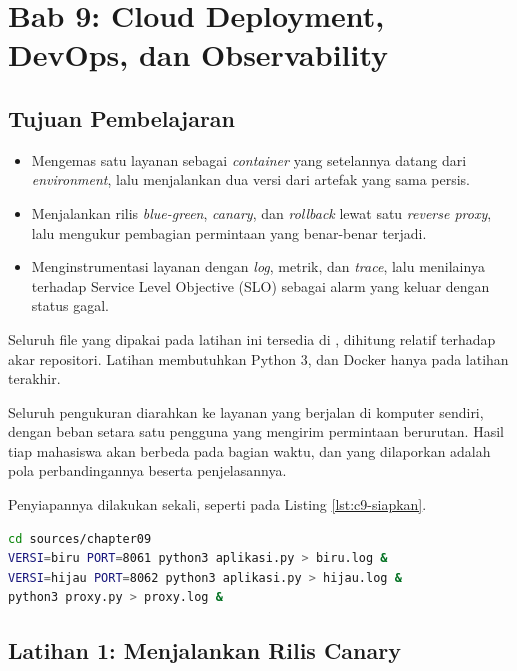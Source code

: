 \section{Bab 9: Cloud Deployment, DevOps, dan Observability}

\subsection*{Tujuan Pembelajaran}
\begin{itemize}
  \item Mengemas satu layanan sebagai \textit{container} yang setelannya
        datang dari \textit{environment}, lalu menjalankan dua versi dari
        artefak yang sama persis.
  \item Menjalankan rilis \textit{blue-green}, \textit{canary}, dan
        \textit{rollback} lewat satu \textit{reverse proxy}, lalu mengukur
        pembagian permintaan yang benar-benar terjadi.
  \item Menginstrumentasi layanan dengan \textit{log}, metrik, dan
        \textit{trace}, lalu menilainya terhadap Service Level Objective (SLO) sebagai alarm yang
        keluar dengan status gagal.
\end{itemize}

Seluruh file yang dipakai pada latihan ini tersedia di
, dihitung relatif terhadap akar repositori.
Latihan membutuhkan Python 3, dan Docker hanya pada latihan terakhir.

Seluruh pengukuran diarahkan ke layanan yang berjalan di komputer sendiri,
dengan beban setara satu pengguna yang mengirim permintaan berurutan. Hasil
tiap mahasiswa akan berbeda pada bagian waktu, dan yang dilaporkan adalah
pola perbandingannya beserta penjelasannya.

Penyiapannya dilakukan sekali, seperti pada Listing \ref{lst:c9-siapkan}.

\begin{lstlisting}[language=bash, caption={Menyalakan dua versi layanan beserta proxynya, memakai \berkas{sources/chapter09/aplikasi.py}}, label={lst:c9-siapkan}]
cd sources/chapter09
VERSI=biru PORT=8061 python3 aplikasi.py > biru.log &
VERSI=hijau PORT=8062 python3 aplikasi.py > hijau.log &
python3 proxy.py > proxy.log &
\end{lstlisting}

\subsection*{Latihan 1: Menjalankan Rilis Canary}

